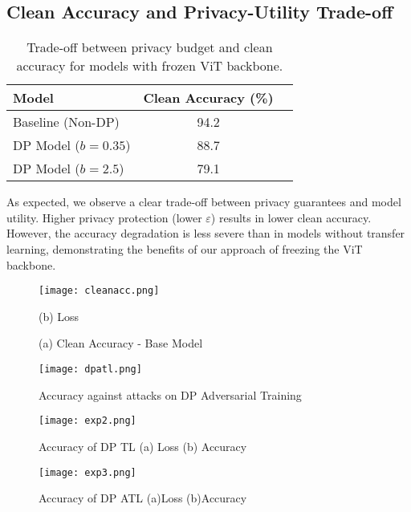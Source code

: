 \documentclass[11pt, conference]{IEEEtran}
\begin{document}
\subsection{Clean Accuracy and Privacy-Utility Trade-off}

\begin{table}[H]
    \centering
    \begin{tabular}{lcc}
        \toprule
        \textbf{Model} & \textbf{Clean Accuracy (\%)}  \\
        \midrule
        Baseline (Non-DP) & 94.2  \\
        DP Model ($b = 0.35$) & 88.7  \\
        DP Model ($b = 2.5$) & 79.1 \\
        \bottomrule
    \end{tabular}
    
    \caption{Trade-off between privacy budget and clean accuracy for models with frozen ViT backbone.}
    \label{tab:privacy_utility}
\end{table}

As expected, we observe a clear trade-off between privacy guarantees and model utility. Higher privacy protection (lower $\varepsilon$) results in lower clean accuracy. However, the accuracy degradation is less severe than in models without transfer learning, demonstrating the benefits of our approach of freezing the ViT backbone.

\begin{figure}[h]
    \centering
    \texttt{[image: cleanacc.png]}
    \caption{ (a) Clean Accuracy - Base Model} (b) Loss
    \label{fig:clean_accuracy}
\end{figure}

\begin{figure}[h]
    \centering
    \texttt{[image: dpatl.png]} 
    \caption{Accuracy against attacks on DP Adversarial Training}
    \label{fig:dpatl}
\end{figure}


\begin{figure}[h]
    \centering
    \texttt{[image: exp2.png]} %
    \caption{Accuracy of DP TL (a) Loss (b) Accuracy }

    \label{fig:exp2}
\end{figure}

\begin{figure}[h]
    \centering
    \texttt{[image: exp3.png]} 
    \caption{Accuracy of DP ATL (a)Loss (b)Accuracy }
    \label{fig:exp3}
\end{figure}
\end{document}
